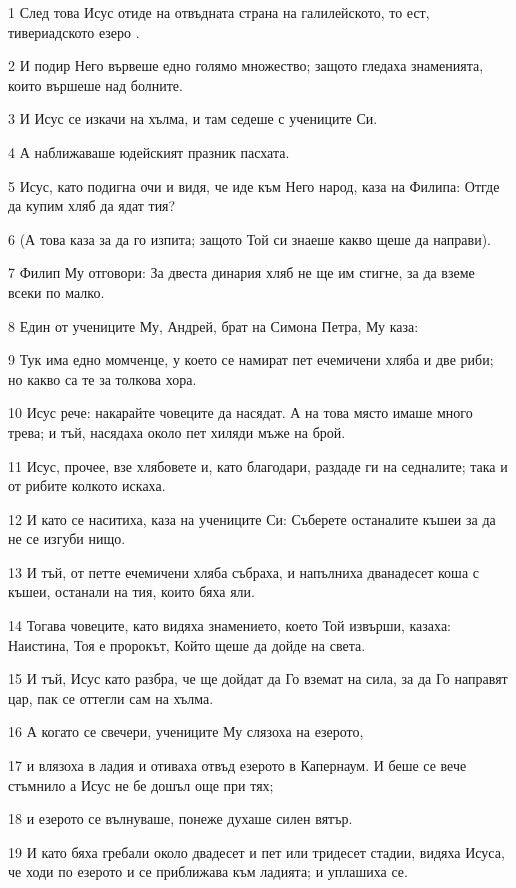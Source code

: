 \par 1 След това Исус отиде на отвъдната страна на галилейското, то ест, тивериадското езеро .
\par 2 И подир Него вървеше едно голямо множество; защото гледаха знаменията, които вършеше над болните.
\par 3 И Исус се изкачи на хълма, и там седеше с учениците Си.
\par 4 А наближаваше юдейският празник пасхата.
\par 5 Исус, като подигна очи и видя, че иде към Него народ, каза на Филипа: Отгде да купим хляб да ядат тия?
\par 6 (А това каза за да го изпита; защото Той си знаеше какво щеше да направи).
\par 7 Филип Му отговори: За двеста динария хляб не ще им стигне, за да вземе всеки по малко.
\par 8 Един от учениците Му, Андрей, брат на Симона Петра, Му каза:
\par 9 Тук има едно момченце, у което се намират пет ечемичени хляба и две риби; но какво са те за толкова хора.
\par 10 Исус рече: накарайте човеците да насядат. А на това място имаше много трева; и тъй, насядаха около пет хиляди мъже на брой.
\par 11 Исус, прочее, взе хлябовете и, като благодари, раздаде ги на седналите; така и от рибите колкото искаха.
\par 12 И като се наситиха, каза на учениците Си: Съберете останалите къшеи за да не се изгуби нищо.
\par 13 И тъй, от петте ечемичени хляба събраха, и напълниха дванадесет коша с къшеи, останали на тия, които бяха яли.
\par 14 Тогава човеците, като видяха знамението, което Той извърши, казаха: Наистина, Тоя е пророкът, Който щеше да дойде на света.
\par 15 И тъй, Исус като разбра, че ще дойдат да Го вземат на сила, за да Го направят цар, пак се оттегли сам на хълма.
\par 16 А когато се свечери, учениците Му слязоха на езерото,
\par 17 и влязоха в ладия и отиваха отвъд езерото в Капернаум. И беше се вече стъмнило а Исус не бе дошъл още при тях;
\par 18 и езерото се вълнуваше, понеже духаше силен вятър.
\par 19 И като бяха гребали около двадесет и пет или тридесет стадии, видяха Исуса, че ходи по езерото и се приближава към ладията; и уплашиха се.
